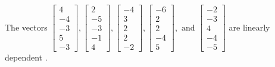 \begin{exercise}
\begin{exerciseStatement}
  \end{exerciseStatement}
  \begin{exerciseAnswer}
   The vectors \(\left[\begin{array}{r}
4 \\
-4 \\
-3 \\
5 \\
-3
\end{array}\right] , \left[\begin{array}{r}
2 \\
-5 \\
-3 \\
-1 \\
4
\end{array}\right] , \left[\begin{array}{r}
-4 \\
3 \\
2 \\
2 \\
-2
\end{array}\right] , \left[\begin{array}{r}
-6 \\
2 \\
2 \\
-4 \\
5
\end{array}\right] , \text{ and } \left[\begin{array}{r}
-2 \\
-3 \\
4 \\
-4 \\
-5
\end{array}\right]\) are 
  	 linearly dependent  .
  


  \end{exerciseAnswer}
\end{exercise}